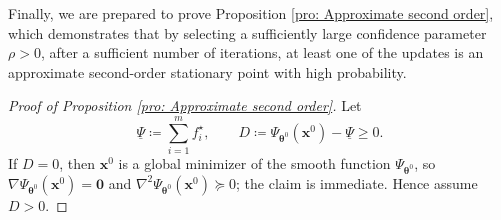 \documentclass{siamart251216}
\begin{document}
Finally, we are prepared to prove Proposition \ref{pro: Approximate second order}, which demonstrates that by selecting a sufficiently large confidence parameter $\rho > 0$, after a sufficient number of iterations, at least one of the updates is an approximate second-order stationary point with high probability.

\begin{proof}[Proof of Proposition \ref{pro: Approximate second order}]
    Let
    \[
        \underline{\Psi}\coloneqq\sum_{i=1}^{m}f_i^\star,
        \qquad
        D\coloneqq\Psi_{\boldsymbol{\theta}^{0}}(\mathbf{x}^{0})-\underline{\Psi}\geq0.
    \]
    If $D=0$, then $\mathbf{x}^{0}$ is a global minimizer of the smooth function $\Psi_{\boldsymbol{\theta}^{0}}$, so $\nabla\Psi_{\boldsymbol{\theta}^{0}}(\mathbf{x}^{0})=\bm{0}$ and $\nabla^{2}\Psi_{\boldsymbol{\theta}^{0}}(\mathbf{x}^{0})\succeq0$; the claim is immediate. Hence assume $D>0$.


\end{proof}
\end{document}
